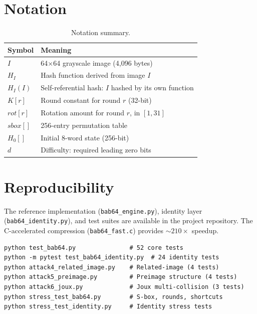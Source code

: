 \documentclass[preprint]{iacrtrans}
\begin{document}
\appendix

\section{Notation}

\begin{table}[h]
\centering
\begin{tabular}{@{}ll@{}}
\toprule
\textbf{Symbol} & \textbf{Meaning} \\
\midrule
$I$ & 64$\times$64 grayscale image (4{,}096 bytes) \\
$H_I$ & Hash function derived from image $I$ \\
$H_I(I)$ & Self-referential hash: $I$ hashed by its own function \\
$K[r]$ & Round constant for round $r$ (32-bit) \\
$\mathit{rot}[r]$ & Rotation amount for round $r$, in $[1, 31]$ \\
$\mathit{sbox}[]$ & 256-entry permutation table \\
$H_0[]$ & Initial 8-word state (256-bit) \\
$d$ & Difficulty: required leading zero bits \\
\bottomrule
\end{tabular}
\caption{Notation summary.}
\end{table}

\section{Reproducibility}

The reference implementation (\texttt{bab64\_engine.py}), identity layer (\texttt{bab64\_identity.py}), and test suites are available in the project repository. The C-accelerated compression (\texttt{bab64\_fast.c}) provides ${\sim}210\times$ speedup.

\begin{lstlisting}
python test_bab64.py               # 52 core tests
python -m pytest test_bab64_identity.py  # 24 identity tests
python attack4_related_image.py    # Related-image (4 tests)
python attack5_preimage.py         # Preimage structure (4 tests)
python attack6_joux.py             # Joux multi-collision (3 tests)
python stress_test_bab64.py        # S-box, rounds, shortcuts
python stress_test_identity.py     # Identity stress tests
\end{lstlisting}
\end{document}
